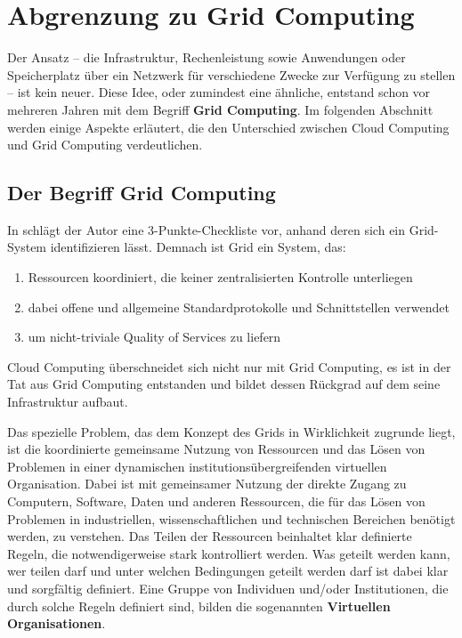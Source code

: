 \section{Abgrenzung zu Grid Computing}
Der Ansatz -- die Infrastruktur, Rechenleistung sowie Anwendungen oder Speicherplatz über ein Netzwerk für verschiedene Zwecke zur Verfügung zu stellen -- ist kein neuer.
Diese Idee, oder zumindest eine ähnliche, entstand schon vor mehreren Jahren mit dem Begriff \textbf{Grid Computing}.
Im folgenden Abschnitt werden einige Aspekte erläutert, die den Unterschied zwischen Cloud Computing und Grid Computing verdeutlichen.
 
\subsection{Der Begriff \glqq Grid Computing\grqq}
In \cite{grid-checklist} schlägt der Autor eine 3-Punkte-Checkliste vor, anhand deren sich ein Grid-System identifizieren lässt. Demnach ist Grid ein System, das:
\begin{enumerate}
  \item Ressourcen koordiniert, die keiner zentralisierten Kontrolle unterliegen
  \item dabei offene und allgemeine Standardprotokolle und Schnittstellen verwendet
  \item um nicht-triviale \glqq Quality of Services\grqq{} zu liefern
\end{enumerate}

Cloud Computing überschneidet sich nicht nur mit Grid Computing, es ist in der Tat aus Grid Computing entstanden und bildet dessen Rückgrad auf dem seine Infrastruktur aufbaut\cite{360-degree-compared}.

Das spezielle Problem, das dem Konzept des Grids in Wirklichkeit zugrunde liegt,
ist die koordinierte gemeinsame Nutzung von Ressourcen und das Lösen von Problemen
in einer dynamischen institutionsübergreifenden virtuellen Organisation.
Dabei ist mit \glqq gemeinsamer Nutzung\grqq{} der direkte Zugang zu Computern, Software, Daten und anderen Ressourcen,
die für das Lösen von Problemen in industriellen, wissenschaftlichen und technischen Bereichen benötigt werden, zu verstehen.
Das Teilen der Ressourcen beinhaltet klar definierte Regeln, die notwendigerweise stark kontrolliert werden.
Was geteilt werden kann, wer teilen darf und unter welchen Bedingungen geteilt werden darf ist dabei klar und sorgfältig definiert.
Eine Gruppe von Individuen und/oder Institutionen, die durch solche Regeln definiert sind,
bilden die sogenannten \textbf{Virtuellen Organisationen}.\cite{anatomy-of-grid}

